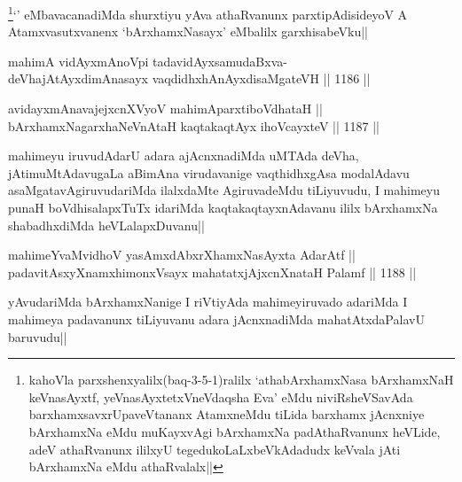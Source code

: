 \begin{artha}
\footnote{kahoVla parxshenxyalilx(baq-3-5-1)ralilx `athabArxhamxNasa bArxhamxNaH keVnasAyxtf, yeVnasAyxtetxVneVdaqsha Eva' eMdu niviRsheVSavAda barxhamxsavxrUpaveVtananx AtamxneMdu tiLida barxhamx jAcnxniye bArxhamxNa eMdu muKayxvAgi bArxhamxNa padAthaRvanunx heVLide, adeV athaRvanunx ililxyU tegedukoLaLxbeVkAdadudx keVvala jAti bArxhamxNa eMdu athaRvalalx||}`\stext' eMbavacanadiMda shurxtiyu yAva athaRvanunx parxtipAdisideyoV A Atamxvasutxvanenx `bArxhamxNasayx' eMbalilx garxhisabeVku||
\end{artha}


\begin{shl}
mahimA vidAyxmAnoV\s pi tadavidAyxsamudaBxva- \\
deVhajAtAyxdimAnasayx vaqdidhxhAnAyxdisaMgateVH ||  1186 ||  
\end{shl}
				
\begin{shl}
avidayxmAnavajejxcnXVyoV mahimAparxtiboVdhataH || \\
bArxhamxNagarxhaNeVnAtaH kaqtakaqtAyx ihoVcayxteV ||  1187 ||  
\end{shl}

\begin{artha}
mahimeyu iruvudAdarU adara ajAcnxnadiMda uMTAda deVha, jAtimuMtAdavugaLa aBimAna virudavanige vaqthidhxgAsa modalAdavu asaMgatavAgiruvudariMda ilalxdaMte AgiruvadeMdu tiLiyuvudu, I mahimeyu punaH boVdhisalapxTuTx idariMda kaqtakaqtayxnAdavanu ililx bArxhamxNa shabadhxdiMda heVLalapxDuvanu||
\end{artha}


\begin{shl}
mahimeYvaMvidhoV yasAmxdAbxrXhamxNasAyxta AdarAtf || \\
padavitAsxyXnamxhimonxV\s sayx mahatatxjAjxcnXnataH Palamf ||  1188 ||  
\end{shl}

\begin{artha}
yAvudariMda bArxhamxNanige I riVtiyAda mahimeyiruvado adariMda I mahimeya padavanunx tiLiyuvanu adara jAcnxnadiMda mahatAtxdaPalavU baruvudu||
\end{artha}


